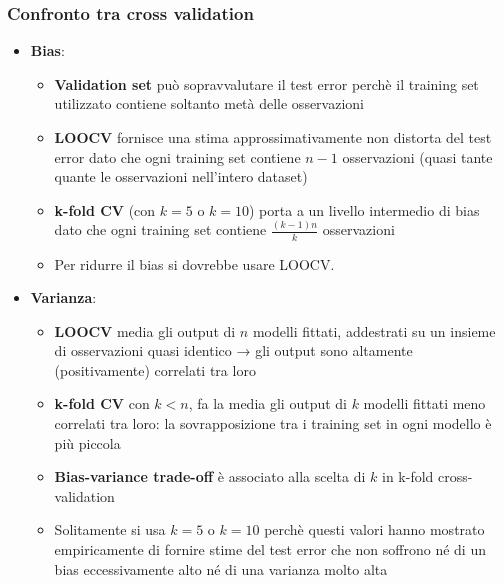 \documentclass[a4paper]{article}
\begin{document}
\subsubsection{Confronto tra cross validation}
\begin{itemize}
  \item \textbf{Bias}:
    \begin{itemize}
      \item \textbf{Validation set} può sopravvalutare il test error perchè il
        training set utilizzato contiene soltanto metà delle osservazioni

      \item \textbf{LOOCV} fornisce una stima approssimativamente non distorta del test error
        dato che ogni training set contiene \( n - 1 \) osservazioni (quasi tante
        quante le osservazioni nell'intero dataset)

      \item \textbf{k-fold CV} (con \( k = 5 \) o \( k = 10 \)) porta a un livello intermedio di bias
        dato che ogni training set contiene \( \frac{(k-1)n}{k} \) osservazioni

      \item Per ridurre il bias si dovrebbe usare LOOCV.
    \end{itemize}

  \item \textbf{Varianza}:
    \begin{itemize}
      \item \textbf{LOOCV} media gli output di \( n \) modelli fittati, addestrati su
        un insieme di osservazioni quasi identico → gli output sono altamente
        (positivamente) correlati tra loro

      \item \textbf{k-fold CV} con \( k < n \), fa la media gli output di \( k \) modelli fittati
        meno correlati tra loro: la sovrapposizione tra i training set in ogni modello
        è più piccola

      \item \textbf{Bias-variance trade-off} è associato alla scelta di \( k \) in k-fold
        cross-validation

      \item Solitamente si usa \( k = 5 \) o \( k = 10 \) perchè questi valori
        hanno mostrato empiricamente di fornire stime del test error che non soffrono
        né di un bias eccessivamente alto né di una varianza molto alta
    \end{itemize}
\end{itemize}
\end{document}
